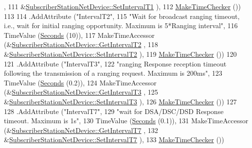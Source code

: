 \begin{DoxyCode}
      ,
111                                      &\hyperlink{classns3_1_1SubscriberStationNetDevice_a3d0eced821975da68d0182f96c17cd81}{SubscriberStationNetDevice::SetIntervalT1}
      ),
112                    \hyperlink{group__time_ga7032965bd4afa578691d88c09e4481c1}{MakeTimeChecker} ())
113 
114     .AddAttribute (\textcolor{stringliteral}{"IntervalT2"},
115                    \textcolor{stringliteral}{"Wait for broadcast ranging timeout, i.e., wait for initial ranging opportunity. Maximum
       is 5*Ranging interval"},
116                    TimeValue (\hyperlink{group__timecivil_ga33c34b816f8ff6628e33d5c8e9713b9e}{Seconds} (10)),
117                    MakeTimeAccessor (&\hyperlink{classns3_1_1SubscriberStationNetDevice_a4ef793930cbb70ec9e49c0c8b7d992ae}{SubscriberStationNetDevice::GetIntervalT2}
      ,
118                                      &\hyperlink{classns3_1_1SubscriberStationNetDevice_a9f483dc03d4994f3a6f302c7a1dc4ecd}{SubscriberStationNetDevice::SetIntervalT2}
      ),
119                    \hyperlink{group__time_ga7032965bd4afa578691d88c09e4481c1}{MakeTimeChecker} ())
120 
121     .AddAttribute (\textcolor{stringliteral}{"IntervalT3"},
122                    \textcolor{stringliteral}{"ranging Response reception timeout following the transmission of a ranging request.
       Maximum is 200ms"},
123                    TimeValue (\hyperlink{group__timecivil_ga33c34b816f8ff6628e33d5c8e9713b9e}{Seconds} (0.2)),
124                    MakeTimeAccessor (&\hyperlink{classns3_1_1SubscriberStationNetDevice_a44d58fe9951838bf4cc43d10f676096c}{SubscriberStationNetDevice::GetIntervalT3}
      ,
125                                      &\hyperlink{classns3_1_1SubscriberStationNetDevice_aa7a44e7812678c7ae922457c17121e64}{SubscriberStationNetDevice::SetIntervalT3}
      ),
126                    \hyperlink{group__time_ga7032965bd4afa578691d88c09e4481c1}{MakeTimeChecker} ())
127 
128     .AddAttribute (\textcolor{stringliteral}{"IntervalT7"},
129                    \textcolor{stringliteral}{"wait for DSA/DSC/DSD Response timeout. Maximum is 1s"},
130                    TimeValue (\hyperlink{group__timecivil_ga33c34b816f8ff6628e33d5c8e9713b9e}{Seconds} (0.1)),
131                    MakeTimeAccessor (&\hyperlink{classns3_1_1SubscriberStationNetDevice_a94cea1ae0e0b557a201822b5f1bf2fef}{SubscriberStationNetDevice::GetIntervalT7}
      ,
132                                      &\hyperlink{classns3_1_1SubscriberStationNetDevice_ac21986727dc13c0963002692260f15c3}{SubscriberStationNetDevice::SetIntervalT7}
      ),
133                    \hyperlink{group__time_ga7032965bd4afa578691d88c09e4481c1}{MakeTimeChecker} ())

\end{DoxyCode}
